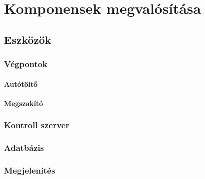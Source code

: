 \chapter{Komponensek megvalósítása}

\section{Eszközök}

\subsection{Végpontok}

\subsubsection{Autótöltő}

\subsubsection{Megszakító}

\subsection{Kontroll szerver}

\subsection{Adatbázis}

\subsection{Megjelenítés}